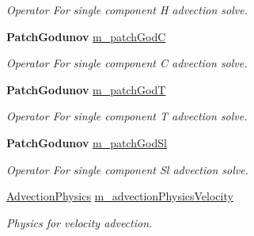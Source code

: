 \begin{DoxyCompactItemize}
\begin{DoxyCompactList}\small\item\em Operator For single component H advection solve. \end{DoxyCompactList}\item 
\mbox{\label{class_a_m_r_level_mushy_layer_af6f10ce77edec7cf1643c7c58cbd9ca5}} 
\textbf{ Patch\+Godunov} \hyperlink{class_a_m_r_level_mushy_layer_af6f10ce77edec7cf1643c7c58cbd9ca5}{m\+\_\+patch\+GodC}
\begin{DoxyCompactList}\small\item\em Operator For single component C advection solve. \end{DoxyCompactList}\item 
\mbox{\label{class_a_m_r_level_mushy_layer_a5d5421485cb631a1031662bc2970b8b2}} 
\textbf{ Patch\+Godunov} \hyperlink{class_a_m_r_level_mushy_layer_a5d5421485cb631a1031662bc2970b8b2}{m\+\_\+patch\+GodT}
\begin{DoxyCompactList}\small\item\em Operator For single component T advection solve. \end{DoxyCompactList}\item 
\mbox{\label{class_a_m_r_level_mushy_layer_aaf69aef4a8257992ca9a178fc9e3789c}} 
\textbf{ Patch\+Godunov} \hyperlink{class_a_m_r_level_mushy_layer_aaf69aef4a8257992ca9a178fc9e3789c}{m\+\_\+patch\+God\+Sl}
\begin{DoxyCompactList}\small\item\em Operator For single component Sl advection solve. \end{DoxyCompactList}\item 
\mbox{\label{class_a_m_r_level_mushy_layer_a233972001b8206d301933423130a7c61}} 
\hyperlink{class_advection_physics}{Advection\+Physics} \hyperlink{class_a_m_r_level_mushy_layer_a233972001b8206d301933423130a7c61}{m\+\_\+advection\+Physics\+Velocity}
\begin{DoxyCompactList}\small\item\em Physics for velocity advection. \end{DoxyCompactList}\item 
\mbox{\label{class_a_m_r_level_mushy_layer_a7e25d8921ac7ab01740ed65b021d0e79}} 

\end{DoxyCompactItemize}
